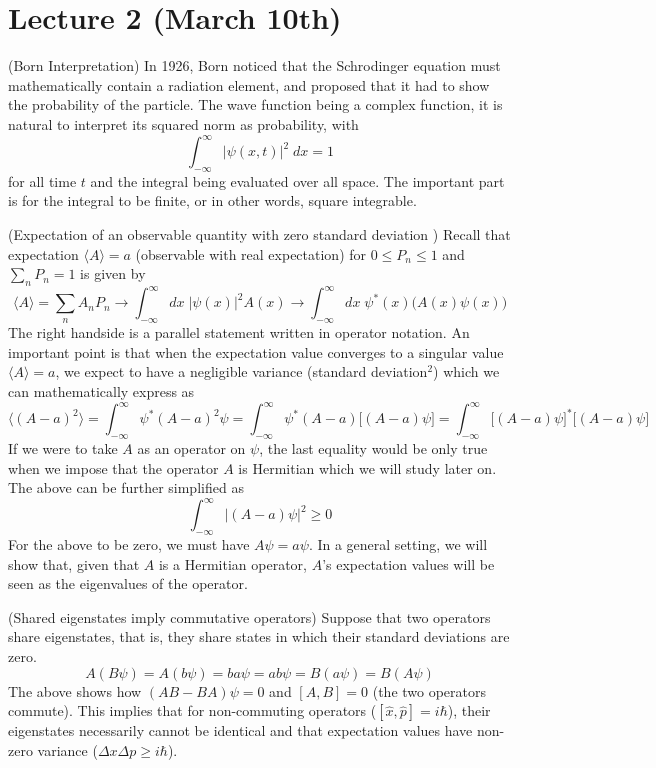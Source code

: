 \section{Lecture 2 (March 10th)}
\begin{prop}
	 (Born Interpretation) In 1926, Born noticed that the Schrodinger equation must mathematically contain a radiation element, and proposed that it had to show the probability of the particle. The wave function being a complex function, it is natural to interpret its squared norm as probability, with
\[\int_{-\infty }^{\infty } |\psi  ({ x},t)|^2\;d{ x}=1\]
for all time $t$ and the integral being evaluated over all space. The important part is for the integral to be finite, or in other words, square integrable. 
\end{prop}
\vspace{2ex}
\begin{thm}
(Expectation of an observable quantity with zero standard deviation ) Recall that expectation $\langle A\rangle =a$ (observable with real expectation) for $0\leq P_{n}\leq 1$ and $\sum_{n}P_{n}=1 $ is given by
\[\langle A\rangle =\sum _{n}A_{n}P_{n}\rightarrow \int_{-\infty }^{\infty } d{ x}\;|\psi  ({ x})|^2A({x})\rightarrow \int_{-\infty }^{\infty } d{ x}\;\psi  ^{*}({ x})\Big(A({ x})\psi  ({x})\Big)\]
The right handside is a parallel statement written in operator notation. An important point is that when the expectation value converges to a singular value $\langle A\rangle =a$, we expect to have a negligible variance (standard deviation$^2$) which we can mathematically express as
\[\langle ( A-a)^2\rangle =\int_{-\infty }^{\infty } \psi  ^{*}(A-a)^2\psi =\int_{-\infty }^{\infty } \psi  ^{*}(A-a)\Big[(A-a)\psi  \Big]=\int_{-\infty }^{\infty } \Big[(A-a)\psi  \Big]^{*}\Big[(A-a)\psi  \Big]\]
If we were to take $A$ as an operator on $\psi $, the last equality would be only true when we impose that the operator $A$ is Hermitian which we will study later on. The above can be further simplified as
\[\int_{-\infty }^{\infty } |(A-a)\psi |^2\geq 0\]
For the above to be zero, we must have $A\psi  =a\psi $. In a general setting, we will show that, given that $A$ is a Hermitian operator, $A$'s expectation values will be seen as the eigenvalues of the operator. 
\end{thm}
\vspace{2ex}
\begin{thm}
(Shared eigenstates imply commutative operators) Suppose that two operators share eigenstates, that is, they share states in which their standard deviations are zero.
\[A(B\psi )=A(b\psi )=ba \psi =ab \psi =B(a\psi )=B(A\psi )\]
The above shows how $(AB-BA)\psi  =0$ and $[A,B]=0$ (the two operators commute). This implies that for non-commuting operators ($[\hat{x},\hat{p}]=i\hbar $), their eigenstates necessarily cannot be identical and that expectation values have non-zero variance ($\Delta x\Delta p\geq i\hbar $).
\end{thm}
\vspace{2ex}
